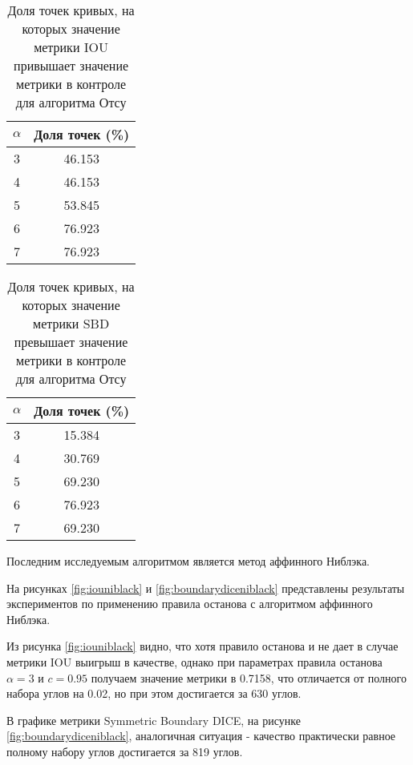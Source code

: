 
\begin{table}[H]
\centering
\caption{Доля точек кривых, на которых значение метрики IOU привышает значение метрики в  контроле для алгоритма Отсу}
\label{tab:otsuiou}
\begin{tabular}{|c|c|}
\hline
\(\alpha\) & Доля точек (\%) \\
\hline
3 & 46.153 \\
4 & 46.153 \\
5 & 53.845 \\
6 & 76.923 \\
7 & 76.923 \\
\hline
\end{tabular}
\end{table}

\begin{table}[H]
\centering
\caption{Доля точек кривых, на которых значение метрики SBD превышает значение метрики в  контроле для алгоритма Отсу}
\label{tab:otsusbd}
\begin{tabular}{|c|c|}
\hline
\(\alpha\) & Доля точек (\%) \\
\hline
3 & 15.384 \\
4 & 30.769 \\
5 & 69.230 \\
6 & 76.923 \\
7 & 69.230 \\
\hline
\end{tabular}
\end{table}

Последним исследуемым алгоритмом является метод аффинного Ниблэка.

На рисунках \ref*{fig:iouniblack} и \ref*{fig:boundarydiceniblack} представлены результаты экспериментов по применению правила останова с алгоритмом аффинного Ниблэка.

Из рисунка \ref*{fig:iouniblack} видно, что хотя правило останова и не дает в случае метрики IOU выигрыш в качестве, однако при параметрах правила останова \(\alpha = 3\) и \(c = 0.95\) получаем значение метрики в 0.7158, что отличается от полного набора углов на 0.02, но при этом достигается за 630 углов.

В графике метрики Symmetric Boundary DICE, на рисунке \ref*{fig:boundarydiceniblack}, аналогичная ситуация - качество практически равное полному набору углов достигается за 819 углов.

